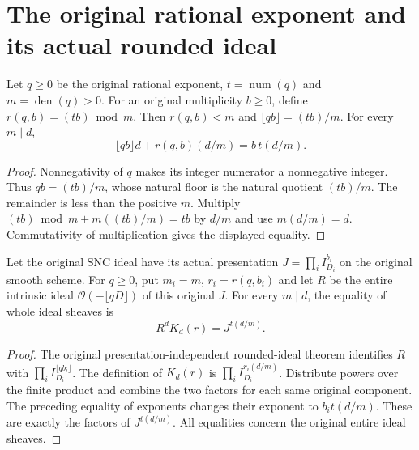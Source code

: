 \section{The original rational exponent and its actual rounded ideal}

\begin{lemma}
\label{lem:kn-nadel-original-rational-residue}
\leanok
Let $q\geq0$ be the original rational exponent, $t=\operatorname{num}(q)$
and $m=\operatorname{den}(q)>0$. For an original multiplicity $b\geq0$,
define $r(q,b)=(tb)\bmod m$. Then $r(q,b)<m$ and
$\lfloor qb\rfloor=(tb)/m$. For every $m\mid d$,
\[
 \lfloor qb\rfloor d+r(q,b)(d/m)=b\,t(d/m).
\]
\end{lemma}
\begin{proof}
Nonnegativity of $q$ makes its integer numerator a nonnegative integer.
Thus $qb=(tb)/m$, whose natural floor is the natural quotient $(tb)/m$.
The remainder is less than the positive $m$. Multiply
$(tb)\bmod m+m((tb)/m)=tb$ by $d/m$ and use $m(d/m)=d$.
Commutativity of multiplication gives the displayed equality.
\end{proof}

\begin{lemma}
\label{lem:kn-nadel-original-rounded-cleared-ideal}
\leanok
{}
Let the original SNC ideal have its actual presentation
$J=\prod_iI_{D_i}^{b_i}$ on the original smooth scheme. For $q\geq0$,
put $m_i=m$, $r_i=r(q,b_i)$ and let $R$ be the entire intrinsic ideal
$\mathcal O(-\lfloor qD\rfloor)$ of this original $J$.
For every $m\mid d$, the equality of whole ideal sheaves is
\[
 R^d K_d(r)=J^{t(d/m)}.
\]
\end{lemma}
\begin{proof}
The original presentation-independent rounded-ideal theorem identifies
$R$ with $\prod_iI_{D_i}^{\lfloor qb_i\rfloor}$. The definition of
$K_d(r)$ is $\prod_iI_{D_i}^{r_i(d/m)}$. Distribute powers over the
finite product and combine the two factors for each same original
component. The preceding equality of exponents changes their exponent
to $b_i t(d/m)$. These are exactly the factors of $J^{t(d/m)}$.
All equalities concern the original entire ideal sheaves.
\end{proof}

